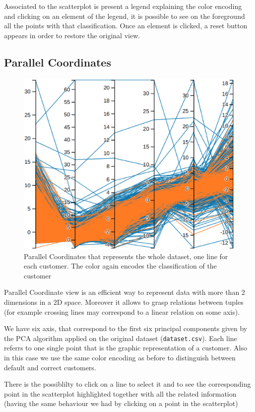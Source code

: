 \documentclass[journal]{vgtc}                %
\begin{document}
Associated to the scatterplot is present a legend explaining the color encoding and clicking on an element of the legend, it is possible to see on the foreground all the points with that classification. Once an element is clicked, a reset button appears in order to
restore the original view.

\subsection{Parallel Coordinates}
\begin{figure}[h]
  \centering
  \includegraphics[scale=0.15]{parallel}
  \caption{Parallel Coordinates that represents the whole dataset, one line for each customer. The color again encodes the classification of the customer}
  \label{parallel}
\end{figure}

Parallel Coordinate view is an efficient way to represent data with more than 2 dimensions in a 2D space. Moreover it allows to grasp relations between tuples (for example crossing lines may correspond to a linear relation on some axis).

We have six axis, that correspond to the first
six principal components given by the PCA algorithm applied on the original dataset (\texttt{dataset.csv}). Each line referrs to one single point that is the
graphic representation of a customer. Also in this case we use the same color encoding as before to distinguish between default and correct customers.

There is the possiblilty to click on a line to select it and to see the corresponding point in the scatterplot highlighted together with all the related information (having the same behaviour we had by clicking on a point in the scatterplot)
\end{document}
